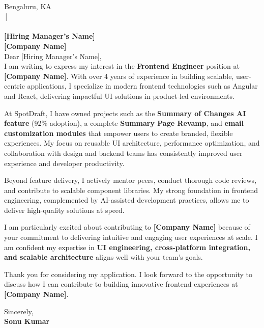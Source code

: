 \documentclass[a4paper,10pt]{article}
\begin{document}
\noindent
\textbf{\ContactName} \\
Bengaluru, KA \\
\href{mailto:\ContactEmail}{\ContactEmail} \,|\, \ContactPhone \\[12pt]

\noindent
[Date] \\[6pt]

\noindent
\textbf{[Hiring Manager’s Name]} \\
\textbf{[Company Name]} \\[12pt]

Dear [Hiring Manager’s Name], \\[6pt]

I am writing to express my interest in the \textbf{Frontend Engineer} position at \textbf{[Company Name]}. With over 4 years of experience in building scalable, user-centric applications, I specialize in modern frontend technologies such as Angular and React, delivering impactful UI solutions in product-led environments.

At SpotDraft, I have owned projects such as the \textbf{Summary of Changes AI feature} (92\% adoption), a complete \textbf{Summary Page Revamp}, and \textbf{email customization modules} that empower users to create branded, flexible experiences. My focus on reusable UI architecture, performance optimization, and collaboration with design and backend teams has consistently improved user experience and developer productivity.

Beyond feature delivery, I actively mentor peers, conduct thorough code reviews, and contribute to scalable component libraries. My strong foundation in frontend engineering, complemented by AI-assisted development practices, allows me to deliver high-quality solutions at speed.

I am particularly excited about contributing to \textbf{[Company Name]} because of your commitment to delivering intuitive and engaging user experiences at scale. I am confident my expertise in \textbf{UI engineering, cross-platform integration, and scalable architecture} aligns well with your team’s goals.

Thank you for considering my application. I look forward to the opportunity to discuss how I can contribute to building innovative frontend experiences at \textbf{[Company Name]}.

\vspace{12pt}
Sincerely, \\
\textbf{Sonu Kumar}
\end{document}
